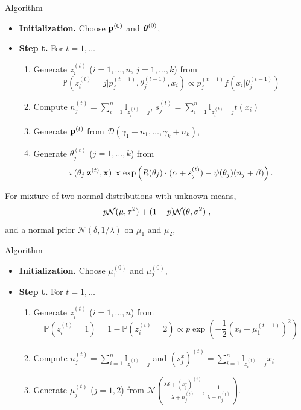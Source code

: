 \begin{slide}
\begin{block}{Algorithm}
{\sffamily
\begin{itemize}
\item  {\bfseries Initialization.} 
		 Choose $\mathbf{p}^{(0)}$ and $\mbox{\boldmath{$\theta$}}^{(0)}$,
\item  {\bfseries Step t.} For $t=1,\ldots$
\begin{enumerate}
\item Generate $z_i^{(t)}$ ($i=1,\ldots,n,\,j=1,\ldots,k$) from 
         \small$$\mathbb{P}\left(z_i^{(t)}=j|p_j^{(t-1)},\theta_j^{(t-1)},x_i\right)
           \propto p_j^{(t-1)}f\left(x_i|\theta_j^{(t-1)}\right)$$ \normalsize
\item Compute $n_j^{(t)}=\sum_{i=1}^n\mathbb{I}_{z_i^{(t)}=j}$, 
		         $s_j^{(t)}=\sum_{i=1}^n\mathbb{I}_{z_i^{(t)}=j}t(x_i)$ 
\item Generate $\mathbf{p}^{(t)}$ from 
	$\mathscr{D}\left(\gamma_1+n_1,\ldots,\gamma_k+n_k\right)$, 
\item Generate $\theta_j^{(t)}$ ($j=1,\dots,k$) from
  \small$$\pi(\theta_j|{\bf z}^{(t)},\mathbf{x})\propto
  \exp\left(R(\theta_j)\cdot(\alpha+s_j^{(t)})-\psi(\theta_j)(n_j+\beta)\right).$$\normalsize
\end{enumerate}
\end{itemize}
}
\end{block}

\end{slide}\begin{slide}

For mixture of two normal distributions with unknown means,
$$
p {\cal{N}}(\mu,\tau^{2}) + (1-p) {\cal{N}}(\theta,\sigma^{2}) \;,
$$
and a normal prior $\mathscr{N}\left(\delta,1/\lambda\right)$ on
$\mu_1$ and $\mu_2$, 

\end{slide}\begin{slide}

\begin{block}{Algorithm}\small
{\sffamily
\begin{itemize}
\item  {\bfseries Initialization.} Choose $\mu_1^{(0)}$ and $\mu_2^{(0)}$,
\item  {\bfseries Step t.} For $t=1,\ldots$
\begin{enumerate}
\item Generate $z_i^{(t)}$ ($i=1,\ldots,n$) from 
                 $$\mathbb{P}\left(z_i^{(t)}=1\right)=1-\mathbb{P}\left(z_i^{(t)}=2\right)\propto
                 p\exp\left(-\frac{1}{2}\left(x_i-\mu_1^{(t-1)}\right)^2\right)$$
\item Compute $\displaystyle n_j^{(t)}=\sum_{i=1}^n\mathbb{I}_{z_i^{(t)}=j}$ and 
                 $\displaystyle (s^x_j)^{(t)}=\sum_{i=1}^n\mathbb{I}_{z_i^{(t)}=j}x_i$
\item Generate $\mu_j^{(t)}$ ($j=1,2$) from $\displaystyle 
	\mathscr{N}\left(\frac{\lambda\delta+(s^x_j)^{(t)}}{\lambda+n_j^{(t)}},
       		\frac{1}{\lambda+n_j^{(t)}}\right)$.
\end{enumerate}
\end{itemize}
}
\end{block}\normalsize


\end{slide}
